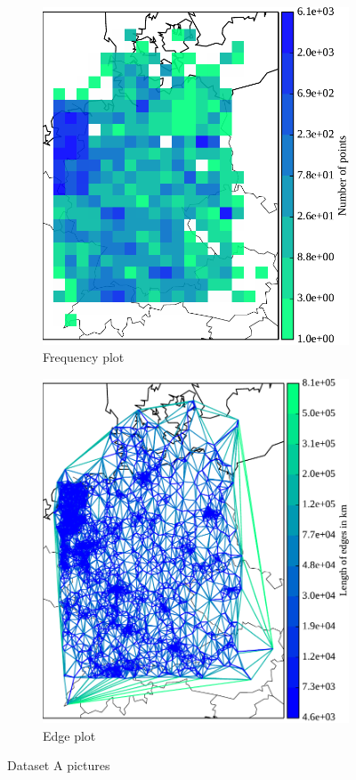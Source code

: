 \begin{figure}[p]
	\begin{subfigure}[b]{0.49\textwidth}
	\centering
	\includegraphics[width=.99\textwidth]{pix/freq_ger_small.pdf}
		\caption{Frequency plot}
	\end{subfigure}
	\begin{subfigure}[b]{0.482\textwidth}
	\centering
	\includegraphics[width=.99\textwidth]{pix/tri_ger_small.pdf}
		\caption{Edge plot}
	\end{subfigure}
	\caption[Dataset A frequency and edge plots]{Dataset A pictures}
	\label{fig:A}
\end{figure}
